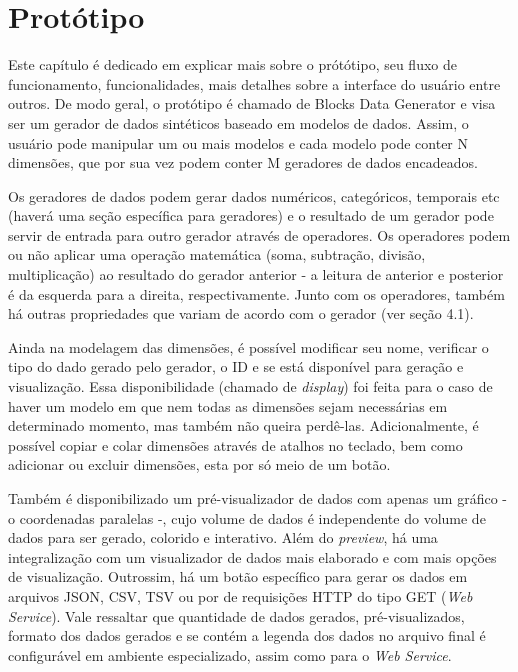 \documentclass[
	12pt,				%
	openright,			%
	twoside,			%
	a4paper,			%
	english,			%
	brazil				%
	]{abntex2}
\begin{document}
\chapter{Protótipo}
	Este capítulo é dedicado em explicar mais sobre o prótótipo, seu fluxo de funcionamento, funcionalidades, mais detalhes sobre a interface do usuário entre outros.
	De modo geral, o protótipo é chamado de Blocks Data Generator e visa ser um gerador de dados sintéticos baseado em modelos de dados.
	Assim, o usuário pode manipular um ou mais modelos e cada modelo pode conter N dimensões, que por sua vez podem conter M geradores de dados encadeados.
	\par
	Os geradores de dados podem gerar dados numéricos, categóricos, temporais etc (haverá uma seção específica para geradores) e o resultado de um gerador pode servir de entrada para outro gerador através de operadores.
	Os operadores podem ou não aplicar uma operação matemática (soma, subtração, divisão, multiplicação) ao resultado do gerador anterior - a leitura de anterior e posterior é da esquerda para a direita, respectivamente.
	Junto com os operadores, também há outras propriedades que variam de acordo com o gerador (ver seção 4.1).
	\par
	Ainda na modelagem das dimensões, é possível modificar seu nome, verificar o tipo do dado gerado pelo gerador, o ID e se está disponível para geração e visualização.
	Essa disponibilidade (chamado de \emph{display}) foi feita para o caso de haver um modelo em que nem todas as dimensões sejam necessárias em determinado momento, mas também não queira perdê-las.
	Adicionalmente, é possível copiar e colar dimensões através de atalhos no teclado, bem como adicionar ou excluir dimensões, esta por só meio de um botão.
	\par
	Também é disponibilizado um pré-visualizador de dados com apenas um gráfico - o coordenadas paralelas -, cujo volume de dados é independente do volume de dados para ser gerado, colorido e interativo.
	Além do \emph{preview}, há uma integralização com um visualizador de dados mais elaborado e com mais opções de visualização.
	Outrossim, há um botão específico para gerar os dados em arquivos JSON, CSV, TSV ou por de requisições HTTP do tipo GET (\emph{Web Service}).
	Vale ressaltar que quantidade de dados gerados, pré-visualizados, formato dos dados gerados e se contém a legenda dos dados no arquivo final é configurável em ambiente especializado, assim como para o \emph{Web Service}.
	\par
\end{document}
